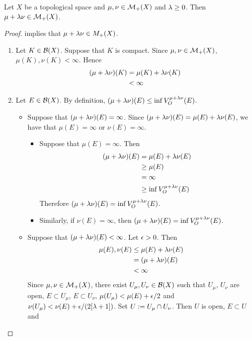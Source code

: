 \documentclass{book}
\begin{document}
	\begin{ex}  
		Let $X$ be a topological space and $\mu, \nu \in \mathcal{M}_+(X)$ and $\lambda \geq 0$. Then $\mu + \lambda \nu \in \mathcal{M}_+(X)$.
	\end{ex}

	\begin{proof}
		\rex{} implies that $\mu + \lambda \nu \in M_+(X)$. 
		\begin{enumerate}
			\item Let $K \in \mathcal{B}(X)$. Suppose that $K$ is compact. Since $\mu, \nu \in \mathcal{M}_+(X)$, $\mu(K), \nu(K) < \infty$. Hence 
			\begin{align*}
				(\mu + \lambda \nu)(K) 
				& = \mu(K) + \lambda \nu(K) \\
				& < \infty 
			\end{align*} 
			\item Let $E \in \mathcal{B}(X)$. By definition, $(\mu + \lambda \nu)(E) \leq \inf V^{\mu + \lambda \nu}_O(E)$.
			\begin{itemize}
				\item Suppose that $(\mu + \lambda \nu)(E) = \infty$. Since $(\mu + \lambda \nu)(E) = \mu(E) + \lambda \nu(E)$, we have that $\mu(E) = \infty$ or $\nu(E) = \infty$. 
				\begin{itemize}
					\item Suppose that $\mu(E) = \infty$. Then
					\begin{align*}
						(\mu + \lambda \nu)(E)
						& = \mu(E) + \lambda \nu(E) \\
						& \geq \mu(E) \\
						& = \infty \\
						& \geq \inf V^{\mu + \lambda \nu}_O(E)
					\end{align*}
					Therefore $(\mu + \lambda \nu)(E) = \inf V^{\mu + \lambda \nu}_O(E)$.
					\item Similarly, if $\nu(E) = \infty$, then $(\mu + \lambda \nu)(E) = \inf V^{\mu + \lambda \nu}_O(E)$.
				\end{itemize}
				\item Suppose that $(\mu + \lambda \nu)(E) < \infty$. Let $\epsilon > 0$. Then 
				\begin{align*}
					\mu(E) , \nu(E)
					& \leq \mu(E) + \lambda \nu(E) \\
					& = (\mu + \lambda \nu)(E) \\
					& < \infty
				\end{align*}
				Since $\mu, \nu \in \mathcal{M}_+(X)$, there exist $U_{\mu}, U_{\nu} \in \mathcal{B}(X)$ such that $U_{\mu}$, $U_{\nu}$ are open, $E \subset U_{\mu}$, $E \subset U_{\nu}$, $\mu(U_{\mu}) < \mu(E) + \epsilon/2$ and $\nu(U_{\mu}) < \nu(E) + \epsilon/(2 [\lambda + 1])$. Set $U \vcentcolon= U_{\mu} \cap U_{\nu}$. Then $U$ is open, $E \subset U$ and

\end{itemize}
\end{enumerate}
\end{proof}
\end{document}

